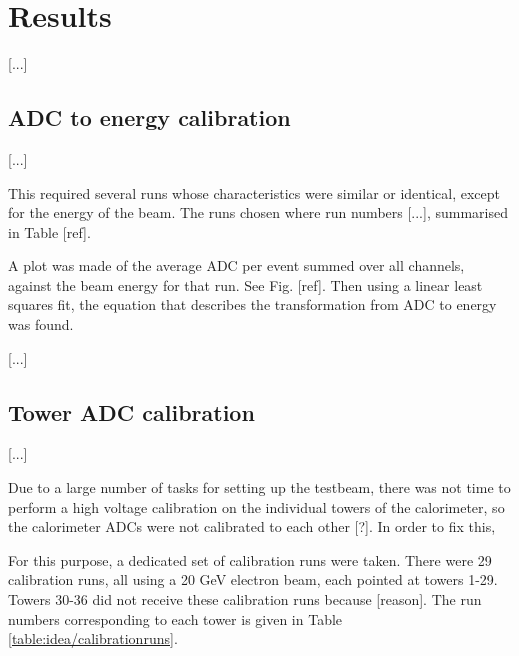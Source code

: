 \section{Results}
[...]

\subsection{ADC to energy calibration}
[...]

This required several runs whose characteristics were similar or identical, except for the energy of the beam. The runs chosen where run numbers [...], summarised in Table [ref].

A plot was made of the average ADC per event summed over all channels, against the beam energy for that run. See Fig. [ref]. Then using a linear least squares fit, the equation that describes the transformation from ADC to energy was found.

[...]

\subsection{Tower ADC calibration}
[...]

Due to a large number of tasks for setting up the testbeam, there was not time to perform a high voltage calibration on the individual towers of the calorimeter, so the calorimeter ADCs were not calibrated to each other [?]. In order to fix this, 

For this purpose, a dedicated set of calibration runs were taken. There were 29 calibration runs, all using a 20 GeV electron beam, each pointed at towers 1-29. Towers 30-36 did not receive these calibration runs because [reason]. The run numbers corresponding to each tower is given in Table \ref{table:idea/calibrationruns}.


